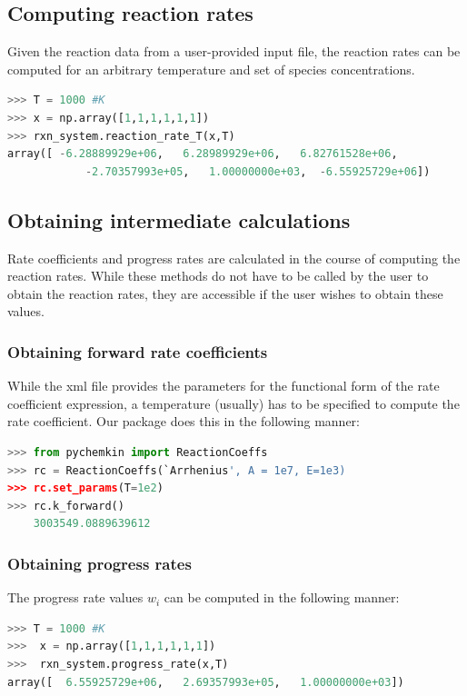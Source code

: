 \documentclass[12pt]{article}
\begin{document}
\subsection{Computing reaction rates}
Given the reaction data from a user-provided input file, the reaction rates can be computed for an arbitrary temperature and set of species concentrations.

\begin{lstlisting}[language = Python, basicstyle = \ttfamily,columns = fullflexible, showstringspaces = False]
>>> T = 1000 #K
>>> x = np.array([1,1,1,1,1,1])
>>> rxn_system.reaction_rate_T(x,T)
array([ -6.28889929e+06,   6.28989929e+06,   6.82761528e+06,
            -2.70357993e+05,   1.00000000e+03,  -6.55925729e+06])
\end{lstlisting}

\subsection{Obtaining intermediate calculations}
Rate coefficients and progress rates are calculated in the course of computing the reaction rates. While these methods do not have to be called by the user to obtain the reaction rates, they are accessible if the user wishes to obtain these values. 

\subsubsection{Obtaining forward rate coefficients}
While the xml file provides the parameters for the functional form of the rate coefficient expression, a temperature (usually) has to be specified to compute the rate coefficient. Our package does this in the following manner:

\begin{lstlisting}[language = Python, basicstyle = \ttfamily,columns = fullflexible, showstringspaces = False]
>>> from pychemkin import ReactionCoeffs
>>> rc = ReactionCoeffs(`Arrhenius', A = 1e7, E=1e3)
>>> rc.set_params(T=1e2)
>>> rc.k_forward()
    3003549.0889639612
\end{lstlisting}


\subsubsection{Obtaining progress rates}
The progress rate values $w_i$ can be computed in the following manner:
\begin{lstlisting}[language = Python, basicstyle = \ttfamily,columns = fullflexible, showstringspaces = False]
>>> T = 1000 #K
>>>  x = np.array([1,1,1,1,1,1])
>>>  rxn_system.progress_rate(x,T)
array([  6.55925729e+06,   2.69357993e+05,   1.00000000e+03])
\end{lstlisting}
\end{document}
